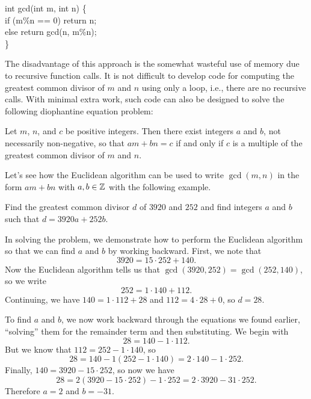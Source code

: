 \medskip
\begin{tt}
\noindent
int gcd(int m, int n) \{\\
\hspace{.25in}\mbox{} if (m\%n == 0) return n;\\
\hspace{.25in}\mbox{} else return gcd(n, m\%n);\\
\}\\
\end{tt}

\medskip The disadvantage of this approach is the somewhat wasteful
use of memory due to recursive function calls. It is not difficult to
develop code for computing the greatest common divisor of $m$ and $n$
using only a loop, i.e., there are no recursive calls. With minimal
extra work, such code can also be designed to solve the following
diophantine equation problem:

\begin{theorem}\label{thm:gcd-dioph}
  Let $m$, $n$, and $c$ be positive integers.  Then there exist
  integers $a$ and $b$, not necessarily non-negative, so that
  $am+bn=c$ if and only if $c$ is a multiple of the greatest common
  divisor of $m$ and $n$.
\end{theorem}

Let's see how the Euclidean algorithm can be used to write $\gcd(m,n)$
in the form $am+bn$ with $a,b\in\mathbb{Z}$ with the following example.

\begin{example}
  Find the greatest common divisor $d$ of $3920$ and $252$ and find
  integers $a$ and $b$ such that $d=3920a+252b$.

  In solving the problem, we demonstrate how to perform the Euclidean
  algorithm so that we can find $a$ and $b$ by working
  backward. First, we note that
  \[3920 = 15\cdot 252 + 140.\]
  Now the Euclidean algorithm tells us that
  $\gcd(3920,252)=\gcd(252,140)$, so we write
  \[252 = 1\cdot 140 + 112.\]
  Continuing, we have $140= 1\cdot 112 + 28$ and $112 = 4\cdot 28+0$,
  so $d=28$. 

  To find $a$ and $b$, we now work backward through the equations we
  found earlier, ``solving'' them for the remainder term and then
  substituting. We begin with
  \[28 = 140-1\cdot 112.\]
  But we know that $112=252-1\cdot 140$, so
  \[28=140-1(252-1\cdot 140) = 2\cdot 140 - 1\cdot 252.\]
  Finally, $140 = 3920-15\cdot 252$, so now we have
  \[28= 2(3920-15\cdot 252) - 1\cdot 252 = 2\cdot 3920-31\cdot 252.\]
  Therefore $a=2$ and $b=-31$.
\end{example}

